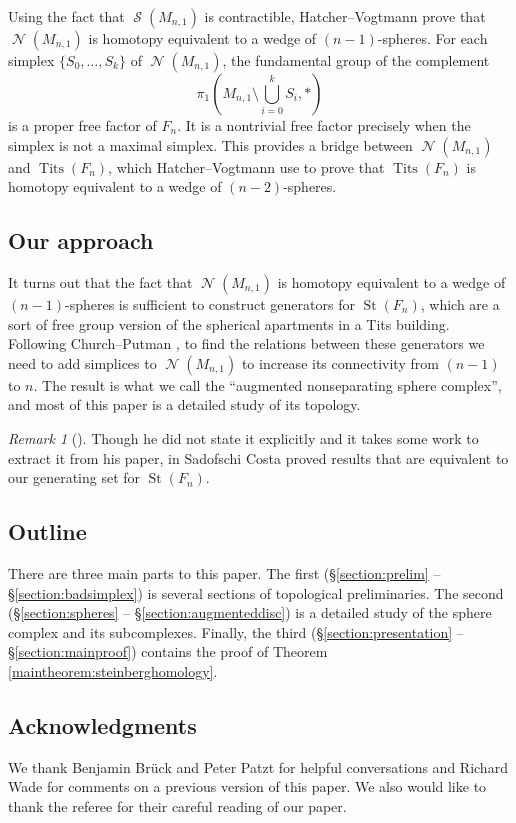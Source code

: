 \documentclass[11pt]{amsart}
\numberwithin{equation}{section}
\theoremstyle{plain}
\theoremstyle{definition}
\theoremstyle{remark}
\newtheorem{rmk}[theorem]{Remark}
\newenvironment{remark}[1][]{\begin{rmk}[#1] \pushQED{\qed}}{\popQED \end{rmk}}
\DeclareMathOperator{\Tits}{Tits}
\DeclareMathOperator{\St}{St}
\DeclareMathOperator{\Spheres}{\mathcal{S}}
\DeclareMathOperator{\NSpheres}{\mathcal{N}}
\begin{document}
Using the fact that $\Spheres(M_{n,1})$ is contractible, Hatcher--Vogtmann prove that $\NSpheres(M_{n,1})$ is
homotopy equivalent to a wedge of $(n-1)$-spheres.  For each simplex $\{S_0,\ldots,S_k\}$
of $\NSpheres(M_{n,1})$, the fundamental group of the complement
\[\pi_1(M_{n,1} \setminus \bigcup_{i=0}^k S_i,\ast)\]
is a proper free factor of $F_n$.  It is a nontrivial free factor precisely when the simplex
is not a maximal simplex.  This provides a bridge between $\NSpheres(M_{n,1})$ and $\Tits(F_n)$,
which Hatcher--Vogtmann use to prove that $\Tits(F_n)$ is homotopy equivalent to a
wedge of $(n-2)$-spheres.

\subsection{Our approach}
It turns out that the fact that $\NSpheres(M_{n,1})$ is
homotopy equivalent to a wedge of $(n-1)$-spheres is sufficient to construct generators
for $\St(F_n)$, which are a sort of free group version of the spherical apartments in
a Tits building.  Following Church--Putman \cite{ChurchPutmanCodim1}, to find
the relations between these generators we need to add simplices to $\NSpheres(M_{n,1})$
to increase its connectivity from $(n-1)$ to $n$.  The result is what we call
the ``augmented nonseparating sphere complex'', and most of this paper is
a detailed study of its topology.

\begin{remark}
Though he did not state it explicitly and it takes some work to extract it from his paper,
in \cite{CostaBases} Sadofschi Costa proved results that are equivalent to our generating set for $\St(F_n)$.
\end{remark}

\subsection{Outline}
There are three main parts to this paper.  The first (\S \ref{section:prelim} -- \S \ref{section:badsimplex})
is several sections of topological preliminaries.  The second
(\S \ref{section:spheres} -- \S \ref{section:augmenteddisc}) is a detailed study of
the sphere complex and its subcomplexes.  Finally, the third (\S \ref{section:presentation} -- \S \ref{section:mainproof}) contains the proof of Theorem \ref{maintheorem:steinberghomology}.

\subsection{Acknowledgments}
We thank Benjamin Br\"{u}ck and Peter Patzt for helpful conversations and Richard Wade for comments
on a previous version of this paper.  We also would like to thank the referee for their careful
reading of our paper.
\end{document}
